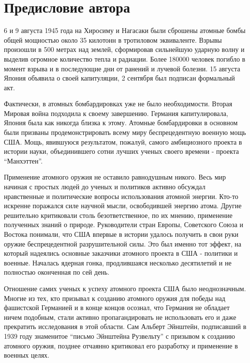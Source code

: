 \chapter*{Предисловие автора}

6 и 9 августа 1945 года на Хиросиму и Нагасаки были сброшены атомные бомбы общей мощностью около 35 килотонн в тротиловом эквиваленте.
Взрывы произошли в 500 метрах над землей, сформировав сильнейшую ударную волну и выделив огромное количество тепла и радиации.
Более 180000 человек погибло в момент взрыва и в последующие дни от ранений и лучевой болезни.
15 августа Япония объявила о своей капитуляции, 2 сентября был подписан формальный акт.

Фактически, в атомных бомбардировках уже не было необходимости. 
Вторая Мировая война подходила к своему завершению. 
Германия капитулировала, Япония была как никогда близка к этому.
Атомные бомбардировки в основном были призваны продемонстрировать всему миру беспрецедентную военную мощь США.
Мощь, явившуюся результатом, пожалуй, самого амбициозного проекта в истории науки, объединившего сотни лучших ученых своего времени - проекта ``Манхэттен''.

Применение атомного оружия не оставило равнодушным никого.
Весь мир начиная с простых людей до ученых и политиков активно обсуждал нравственные и политические вопросы использования атомной энергии.
Кто-то искренне поражался силе научной мысли, освободившей энергию атома.
Другие решительно критиковали столь безответственное, по их мнению, применение полученных знаний о природе.
Руководители стран Европы, Советского Союза и Востока понимали, что США впервые в истории удалось получить в свои руки оружие беспрецедентной разрушительной силы. 
Это был именно тот эффект, на который надеялись основные заказчики атомного проекта в США - политики и военные.  
Началась ядерная гонка, продлившаяся несколько десятилетий и не полностью оконченная по сей день.

Отношение самих ученых к успеху атомного проекта США было неоднозначным.
Многие из тех, кто призывал к созданию атомного оружия для победы над фашистской Германией и в конце концов осознал, что Германия не обладает ничем подобным, стали активно пропагандировать не использовать его и даже прекратить исследования в этой области. 
Сам Альберт Эйнштейн, подписавший в 1939 году знаменитое ``письмо Эйнштейна Рузвельту'' с призывом к созданию атомного оружия, позднее отчаянно критиковал его разработку и применение в военных целях.

